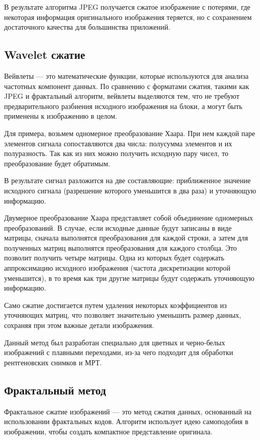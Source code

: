 В результате алгоритма JPEG получается сжатое изображение с потерями, где некоторая информация оригинального изображения теряется, но с сохранением достаточного качества для большинства приложений.

\subsection{Wavelet сжатие}

Вейвлеты --- это математические функции, которые используются для анализа частотных компонент данных. По сравнению с форматами сжатия, такими как JPEG и фрактальный алгоритм, вейвлеты выделяются тем, что не требуют предварительного разбиения исходного изображения на блоки, а могут быть применены к изображению в целом.

Для примера, возьмем одномерное преобразование Хаара. При нем каждой паре элементов сигнала сопоставляются два числа: полусумма элементов и их полуразность. Так как из них можно получить исходную пару чисел, то преобразование будет обратимым.

В результате сигнал разложится на две составляющие: приближенное значение исходного сигнала (разрешение которого уменьшится в два раза) и уточняющую информацию.

Двумерное преобразование Хаара представляет собой объединение одномерных преобразований. В случае, если исходные данные будут записаны в виде матрицы, сначала выполнятся преобразования для каждой строки, а затем для полученных матриц выполнятся преобразования для каждого столбца. Это позволит получить четыре матрицы. Одна из которых будет содержать аппроксимацию исходного изображения (частота дискретизации которой уменьшится), в то время как три другие матрицы будут содержать уточняющую информацию. 

Само сжатие достигается путем удаления некоторых коэффициентов из уточняющих матриц, что позволяет значительно уменьшить размер данных, сохраняя при этом важные детали изображения.

Данный метод был разработан специально для цветных и черно-белых изображений с плавными переходами, из-за чего подходит для обработки рентгеновских снимков и МРТ.

\subsection{Фрактальный метод}

Фрактальное сжатие изображений --- это метод сжатия данных, основанный на использовании фрактальных кодов. Алгоритм использует идею самоподобия в изображении, чтобы создать компактное представление оригинала.

